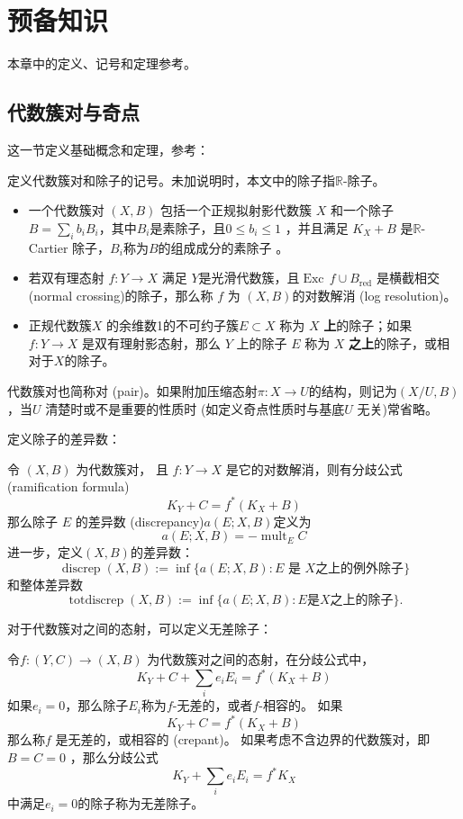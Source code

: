 \chapter{预备知识}
本章中的定义、记号和定理参考\cite{BCHM10,km,kmm}。
\section{代数簇对与奇点}
这一节定义基础概念和定理，参考\cite{BCHM10,km}：
\begin{definition}
  定义代数簇对和除子的记号。未加说明时，本文中的除子指$\mathbb{R}$-除子。
  \begin{itemize}
    \item 一个代数簇对 $(X,B)$ 包括一个正规拟射影代数簇 $X$ 和一个除子 $B=\sum_{i}b_{i}B_{i}$，其中$B_{i}$是素除子，且$0\leqslant b_{i} \leqslant 1$ ，并且满足 $ K_{X}+B $ 是$\mathbb{R}$-Cartier 除子，$B_{i}$称为$B$的组成成分的素除子 。
    \item 若双有理态射 $f:Y\to X$ 满足 $Y$是光滑代数簇，且$\operatorname{Exc}\,f \cup B_{\text{red}} $ 是横截相交 (normal crossing)的除子，那么称 $f$ 为 $(X,B)$的对数解消 (log resolution)。  
    \item 正规代数簇$X$ 的余维数1的不可约子簇$ E \subset X $ 称为 $X$ \textbf{上}的除子；如果 $f: Y \to X$ 是双有理射影态射，那么 $Y$ 上的除子 $E$ 称为 $X$ \textbf{之上}的除子，或相对于$X$的除子。  
  \end{itemize}
  代数簇对也简称对 (pair)。如果附加压缩态射$\pi:X\to U$的结构，则记为$(X/U,B)$，当$U$ 清楚时或不是重要的性质时 (如定义奇点性质时与基底$U$ 无关)常省略。 
\end{definition}

定义除子的差异数：
\begin{definition}
  令 $(X, B)$ 为代数簇对， 且 $f: Y\to X$ 是它的对数解消，则有分歧公式 (ramification formula)
  \[ K_{Y}+C=f^*(K_{X}+B) \]
  那么除子 $E$ 的差异数 (discrepancy)$a(E;X,B) $定义为
  \[ a(E;X,B)=-\operatorname{mult}_{E}C \]
  进一步，定义$(X,B) $的差异数：
  \[ \operatorname{discrep}(X, B) := \inf\{a(E; X, B) : E \text{ 是 } X \text{之上的例外除子} \} \]
  和整体差异数
  \[ \operatorname{totdiscrep}(X, B) :=\inf \{a(E; X, B) : E \text{是} X \text{之上的除子}\}. \]
\end{definition}
对于代数簇对之间的态射，可以定义无差除子：
\begin{definition}
 令$f:(Y,C)\to (X,B)$ 为代数簇对之间的态射，在分歧公式中，
 \[ K_{Y}+C + \sum_{i}e_{i}E_{i}=f^{*}(K_{X}+B) \]
 如果$e_{i}=0$，那么除子$E_{i}$称为$f$-无差的，或者$f$-相容的。 如果
 \[ K_{Y}+C=f^{*}(K_{X}+B) \]
那么称$f$ 是无差的，或相容的 (crepant)。
如果考虑不含边界的代数簇对，即$B=C=0$ ，那么分歧公式
 \[ K_{Y} + \sum_{i}e_{i}E_{i}=f^{*}K_{X} \]
 中满足$e_{i}=0$的除子称为无差除子。
\end{definition}

